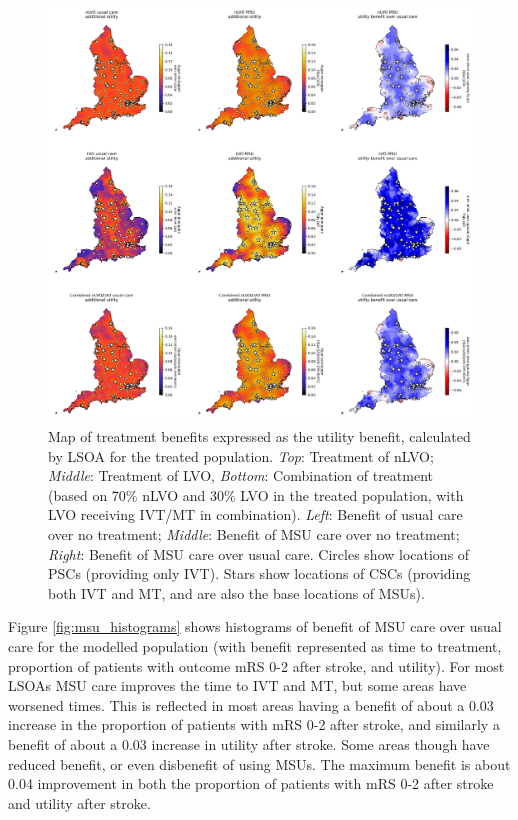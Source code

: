 \begin{figure}[h!]
    \centering
    \includegraphics[width=1\linewidth]{images/map_utility.jpg}
    \caption{Map of treatment benefits expressed as the  utility benefit, calculated by LSOA for the treated population. \textit{Top}: Treatment of nLVO; \textit{Middle}: Treatment of LVO, \textit{Bottom}: Combination of treatment (based on 70\% nLVO and 30\% LVO in the treated population, with LVO receiving IVT/MT in combination). \textit{Left}: Benefit of usual care over no treatment; \textit{Middle}: Benefit of MSU care over no treatment; \textit{Right}: Benefit of MSU care over usual care. Circles show locations of PSCs (providing only IVT). Stars show locations of CSCs (providing both IVT and MT, and are also the base locations of MSUs).}
    \label{fig:msu_map_utility}
\end{figure}


Figure \ref{fig:msu_histograms} shows histograms of benefit of MSU care over usual care for the modelled population (with benefit represented as time to treatment, proportion of patients with outcome mRS 0-2 after stroke, and utility). For most LSOAs MSU care improves the time to IVT and MT, but some areas have worsened times. This is reflected in most areas having a benefit of about a 0.03 increase in the proportion of patients with mRS 0-2 after stroke, and similarly a benefit of about a 0.03 increase in utility after stroke. Some areas though have reduced benefit, or even disbenefit of using MSUs. The maximum benefit is about 0.04 improvement in both the proportion of patients with mRS 0-2 after stroke and utility after stroke.

